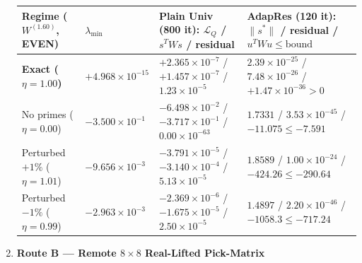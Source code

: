 \documentclass[
  11pt,
]{article}
\newcounter{none} %
\begin{document}
\begin{enumerate}
  {\def\LTcaptype{none} %
  \begin{longtable}[]{@{}
    >{\raggedright\arraybackslash}p{}
    >{\centering\arraybackslash}p{}
    >{\centering\arraybackslash}p{}
    >{\centering\arraybackslash}p{}@{}}
  \toprule\noalign{}
  \begin{minipage}[b]{\linewidth}\raggedright
  Regime (\(W^{(1.60)}\), EVEN)
  \end{minipage} & \begin{minipage}[b]{\linewidth}\centering
  \(\lambda_{\min}\)
  \end{minipage} & \begin{minipage}[b]{\linewidth}\centering
  Plain Univ (800 it): \(\mathcal{L}_Q\) / \(s^T W s\) / residual
  \end{minipage} & \begin{minipage}[b]{\linewidth}\centering
  AdapRes (120 it): \(\|s^*\|\) / residual /
  \(u^T W u \le \text{bound}\)
  \end{minipage} \\
  \midrule\noalign{}
  \endhead
  \bottomrule\noalign{}
  \endlastfoot
  \textbf{Exact (\(\eta = 1.00\))} & \textbf{\(+4.968 \times 10^{-15}\)}
  & \(+2.365 \times 10^{-7}\) / \(+1.457 \times 10^{-7}\) /
  \(1.23 \times 10^{-5}\) & \textbf{\(2.39 \times 10^{-25}\)} /
  \(7.48 \times 10^{-26}\) / \textbf{\(+1.47 \times 10^{-36} > 0\)} \\
  No primes (\(\eta = 0.00\)) & \(-3.500 \times 10^{-1}\) &
  \(-6.498 \times 10^{-2}\) / \(-3.717 \times 10^{-1}\) /
  \(0.00 \times 10^{-63}\) & \(1.7331\) / \(3.53 \times 10^{-45}\) /
  \textbf{\(-11.075 \le -7.591\)} \\
  Perturbed \(+1\%\) (\(\eta = 1.01\)) & \(-9.656 \times 10^{-3}\) &
  \(-3.791 \times 10^{-5}\) / \(-3.140 \times 10^{-4}\) /
  \(5.13 \times 10^{-5}\) & \(1.8589\) /
  \textbf{\(1.00 \times 10^{-24}\)} /
  \textbf{\(-424.26 \le -290.64\)} \\
  Perturbed \(-1\%\) (\(\eta = 0.99\)) & \(-2.963 \times 10^{-3}\) &
  \(-2.369 \times 10^{-6}\) / \(-1.675 \times 10^{-5}\) /
  \(2.50 \times 10^{-5}\) & \(1.4897\) /
  \textbf{\(2.20 \times 10^{-46}\)} /
  \textbf{\(-1058.3 \le -717.24\)} \\
  \end{longtable}
  }
\item
  \textbf{Route B --- Remote \(8 \times 8\) Real-Lifted Pick-Matrix
}
\end{enumerate}
\end{document}
